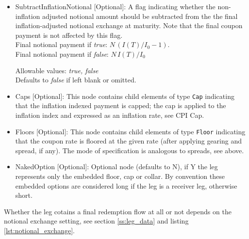 \begin{itemize}
\item SubtractInflationNotional [Optional]: A flag indicating whether
  the non-inflation adjusted notional amount should be subtracted from
  the the final inflation-adjusted notional exchange at maturity.
  Note that the final coupon payment is not affected by this flag. \\ 
Final notional payment if \emph{true}: $N \,(I(T)/I_0-1)$. \\ 
Final notional payment if  \emph{false}: $N \,I(T)/I_0$ 

Allowable values:  \emph{true, false} 
\\Defaults to \emph{false}  if left blank or omitted.

\item Caps [Optional]: This node contains child elements of type
  \lstinline!Cap! indicating that the inflation indexed payment is
  capped; the cap is applied to the inflation index and expressed as
  an inflation rate, see CPI Cap.

\item Floors [Optional]: This node contains child elements of type \lstinline!Floor! indicating that the coupon rate is floored at
  the given rate (after applying gearing and spread, if any). The mode of specification is analogous to spreads, see
  above.

\item NakedOption [Optional]: Optional node (defaults to N), if Y the leg represents only the embedded floor, cap or collar. 
By convention these embedded options are considered long if the leg is a receiver leg, otherwise short. 
 
\end{itemize} 

Whether the leg cotains a final redemption flow at all or not depends on the
 notional exchange setting, see section \ref{ss:leg_data} and listing \ref{lst:notional_exchange}.

